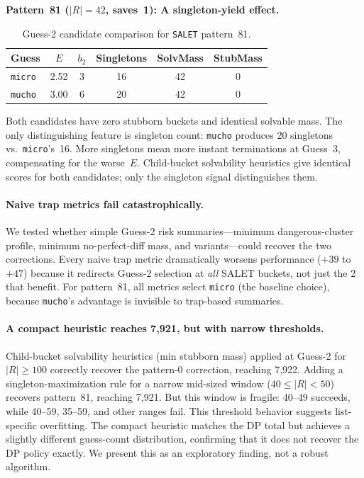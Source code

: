 \documentclass[11pt]{article}
\begin{document}
	\textbf{Pattern~81 ($|R| = 42$, saves~1): A singleton-yield effect.}
	
	\begin{table}[h]
		\centering
		\caption{Guess-2 candidate comparison for \texttt{SALET} pattern~81.}
		\label{tab:pattern81}
		\begin{tabular}{@{}lccccc@{}}
			\toprule
			Guess & $E$ & $b_2$ & Singletons & SolvMass & StubMass \\
			\midrule
			\texttt{micro} & 2.52 & 3 & 16 & 42 & 0 \\
			\texttt{mucho} & 3.00 & 6 & 20 & 42 & 0 \\
			\bottomrule
		\end{tabular}
	\end{table}
	
	Both candidates have zero stubborn buckets and identical solvable mass.  The only distinguishing feature is singleton count: \texttt{mucho} produces 20 singletons vs.\ \texttt{micro}'s~16.  More singletons mean more instant terminations at Guess~3, compensating for the worse~$E$.  Child-bucket solvability heuristics give identical scores for both candidates; only the singleton signal distinguishes them.
	
	\paragraph{Naive trap metrics fail catastrophically.}
	We tested whether simple Guess-2 risk summaries---minimum dangerous-cluster profile, minimum no-perfect-diff mass, and variants---could recover the two corrections.  Every naive trap metric dramatically worsens performance ($+39$ to $+47$) because it redirects Guess-2 selection at \emph{all} SALET buckets, not just the 2 that benefit.  For pattern~81, all metrics select \texttt{micro} (the baseline choice), because \texttt{mucho}'s advantage is invisible to trap-based summaries.
	
	\paragraph{A compact heuristic reaches 7,921, but with narrow thresholds.}
	Child-bucket solvability heuristics (min stubborn mass) applied at Guess-2 for $|R| \geq 100$ correctly recover the pattern-0 correction, reaching 7,922.  Adding a singleton-maximization rule for a narrow mid-sized window ($40 \leq |R| < 50$) recovers pattern~81, reaching 7,921.  But this window is fragile: 40--49 succeeds, while 40--59, 35--59, and other ranges fail.  This threshold behavior suggests list-specific overfitting.  The compact heuristic matches the DP total but achieves a slightly different guess-count distribution, confirming that it does not recover the DP policy exactly.  We present this as an exploratory finding, not a robust algorithm.
	
\end{document}
